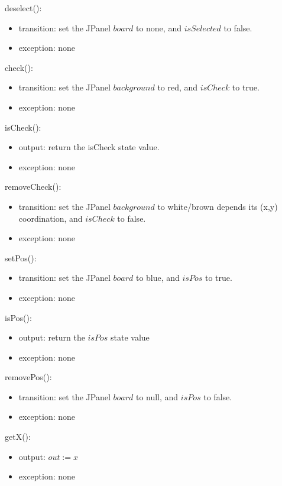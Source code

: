 \documentclass[12pt]{article}
\begin{document}
\noindent deselect():
\begin{itemize}
\item transition: set the JPanel $board$ to none, and $isSelected$ to false.
\item exception: none
\end{itemize}

\noindent check():
\begin{itemize}
\item transition: set the JPanel $background$ to red, and $isCheck$ to true.
\item exception: none
\end{itemize}

\noindent isCheck():
\begin{itemize}
\item output: return the isCheck state value.
\item exception: none
\end{itemize} 

\noindent removeCheck():
\begin{itemize}
\item transition: set the JPanel $background$ to white/brown depends its (x,y) coordination, and $isCheck$ to false. 
\item exception: none
\end{itemize}

\noindent setPos():
\begin{itemize}
\item transition: set the JPanel $board$ to blue, and $isPos$ to true.
\item exception: none
\end{itemize}

\noindent isPos():
\begin{itemize}
\item output: return the $isPos$ state value
\item exception: none
\end{itemize}

\noindent removePos():
\begin{itemize}
\item transition: set the JPanel $board$ to null, and $isPos$ to false.
\item exception: none
\end{itemize}

\noindent getX():
\begin{itemize}
\item output: $out := x$
\item exception: none
\end{itemize}
\end{document}
